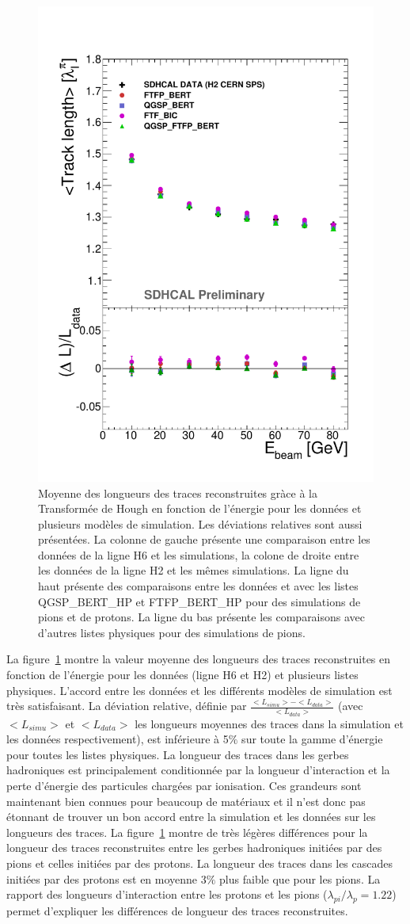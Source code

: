 \begin{figure}[!ht]
  \includegraphics[width=.44\textwidth]{Shower/figs/TRACKLENGTH_PION_MODEL_NOV.pdf}
  \caption{Moyenne des longueurs des traces reconstruites gràce à la Transformée de Hough en fonction de l'énergie pour les données et plusieurs modèles de simulation. Les déviations relatives sont aussi présentées. La colonne de gauche présente une comparaison entre les données de la ligne H6 et les simulations, la colone de droite entre les données de la ligne H2 et les mêmes simulations. La ligne du haut présente des comparaisons entre les données et avec les listes QGSP\_BERT\_HP et FTFP\_BERT\_HP pour des simulations de pions et de protons. La ligne du bas présente les comparaisons avec d'autres listes physiques pour des simulations de pions.}
  \label{fig.tracklength_pi-_ebeam}
\end{figure}

La figure~\ref{fig.tracklength_pi-_ebeam} montre la valeur moyenne des longueurs des traces reconstruites en fonction de l'énergie pour les données (ligne H6 et H2) et plusieurs listes physiques. L'accord entre les données et les différents modèles de simulation est très satisfaisant. La déviation relative, définie par $\frac{<L_{simu}>-<L_{data}>}{<L_{data}>}$ (avec $<L_{simu}>$ et $<L_{data}>$ les longueurs moyennes des traces dans la simulation et les données respectivement), est inférieure à 5$\%$ sur toute la gamme d'énergie pour toutes les listes physiques. La longueur des traces dans les gerbes hadroniques est principalement conditionnée par la longueur d'interaction et la perte d'énergie des particules chargées par ionisation. Ces grandeurs sont maintenant bien connues pour beaucoup de matériaux et il n'est donc pas étonnant de trouver un bon accord entre la simulation et les données sur les longueurs des traces. 
La figure~\ref{fig.tracklength_pi-_ebeam} montre de très légères différences pour la longueur des traces reconstruites entre les gerbes hadroniques initiées par des pions et celles initiées par des protons. La longueur des traces dans les cascades initiées par des protons est en moyenne 3$\%$ plus faible que pour les pions. La rapport des longueurs d’interaction entre les protons et les pions ($\lambda_{pi}/\lambda_{p}=1.22$) permet d'expliquer les différences de longueur des traces reconstruites. 

